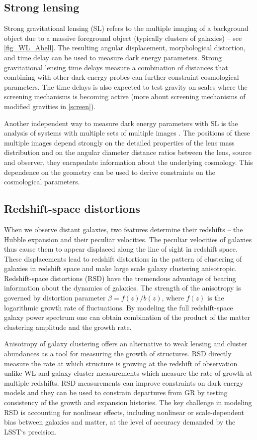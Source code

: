 \subsection{Strong lensing}
Strong gravitational lensing (SL) refers to the multiple imaging of a background object due to a massive foreground object (typically clusters of galaxies) -- see \autoref{fig_WL_Abell}. The resulting angular displacement, morphological distortion, and time delay can be used to measure dark energy parameters. Strong gravitational lensing time delays measure a combination of distances that combining with other dark energy probes can further constraint cosmological parameters. The time delays is also expected to test gravity on scales where the screening mechanisms is becoming active (more about screening mechanisms of modified gravities in \autoref{screen}).

Another independent way to measure dark energy parameters with SL is the analysis of systems with multiple sets of multiple images \textcite{SL_in_CLGs}. The positions of these multiple images depend strongly on the detailed properties of the lens mass distribution and on the angular diameter distance ratios between the lens, source and observer, they encapsulate information about the underlying cosmology. This dependence on the geometry can be used to derive constraints on the cosmological parameters.
\subsection{Redshift-space distortions}
\label{sec:rsd}
When we observe distant galaxies, two features determine their redshifts -- the Hubble expansion and their peculiar velocities. The peculiar velocities of galaxies thus cause them to appear displaced along the line of sight in redshift space. These displacements lead to redshift distortions in the pattern of clustering of galaxies in redshift space and make large scale galaxy clustering anisotropic. Redshift-space distortions (RSD) have the tremendous advantage of bearing information about the dynamics of galaxies. The strength of the anisotropy is governed by distortion parameter $\beta = f(z)/b(z)$, where $f(z)$ is the logarithmic growth rate of fluctuations. By modeling the full redshift-space galaxy power spectrum one can obtain combination of the product of the matter clustering amplitude and the growth rate.

Anisotropy of galaxy clustering offers an alternative to weak lensing and cluster abundances as a tool for measuring the growth of structures. RSD directly measure the rate at which structure is growing at the redshift of observation unlike WL and galaxy cluster measurements  which measure the rate of growth at multiple redshifts. RSD measurements can improve constraints on dark energy models and they can be used to constrain departures from GR by testing consistency of the growth and expansion histories. The key challenge in modeling RSD is accounting for nonlinear effects, including nonlinear or scale-dependent bias between galaxies and matter, at the level of accuracy demanded by the LSST`s precision.